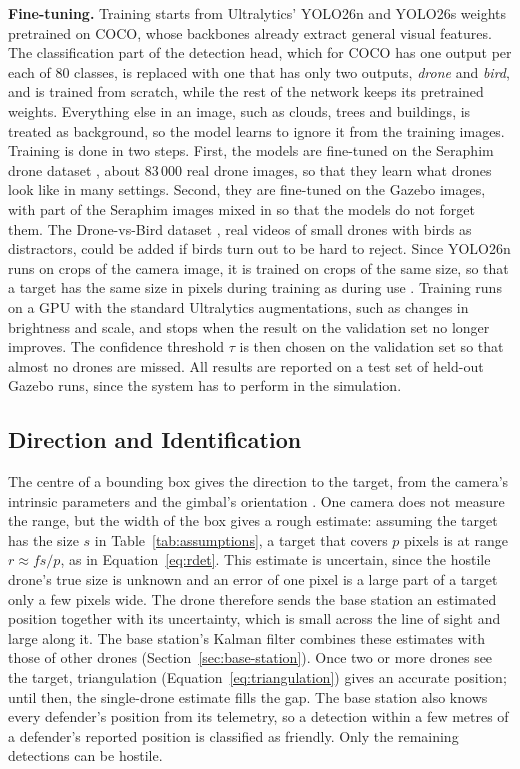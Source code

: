 \textbf{Fine-tuning.} Training starts from Ultralytics' YOLO26n and YOLO26s
weights pretrained on COCO, whose backbones already extract general visual
features. The classification part of the detection head, which for COCO has
one output per each of 80 classes, is replaced with one that has only two
outputs, \emph{drone} and \emph{bird}, and is trained from scratch, while the
rest of the network keeps its pretrained weights. Everything else in an image,
such as clouds, trees and buildings, is treated as background, so the model
learns to ignore it from the training images. Training is done in two steps.
First, the models are fine-tuned on the Seraphim drone dataset
\cite{seraphim}, about 83\,000 real drone images, so that they learn what
drones look like in many settings. Second, they are fine-tuned on the Gazebo
images, with part of the Seraphim images mixed in so that the models do not
forget them. The Drone-vs-Bird dataset \cite{coluccia2021drone}, real
videos of small drones with birds as distractors, could be added if birds
turn out to be hard to reject. Since YOLO26n runs on crops of the camera
image, it is trained on crops of the same size, so that a target has the
same size in pixels during training as during use \cite{akyon2022sahi}.
Training runs on a GPU with the standard Ultralytics augmentations, such as
changes in brightness and scale, and stops when the result on the validation
set no longer improves. The confidence threshold $\tau$ is then chosen on
the validation set so that almost no drones are missed. All results are
reported on a test set of held-out Gazebo runs, since the system has to
perform in the simulation.

\subsection{Direction and Identification}
The centre of a bounding box gives the direction to the target, from the
camera's intrinsic parameters and the gimbal's orientation
\cite{hartley2004multiple}. One camera does not measure the range, but the
width of the box gives a rough estimate: assuming the target has the size
$s$ in Table~\ref{tab:assumptions}, a target that covers $p$ pixels is at
range $r \approx f s / p$, as in Equation~\eqref{eq:rdet}. This estimate is
uncertain, since the hostile drone's true size is unknown and an error of
one pixel is a large part of a target only a few pixels wide. The drone
therefore sends the base station an estimated position together with its
uncertainty, which is small across the line of sight and large along it.
The base station's Kalman filter combines these estimates with those of
other drones (Section~\ref{sec:base-station}). Once two or more drones see
the target, triangulation (Equation~\eqref{eq:triangulation}) gives an
accurate position; until then, the single-drone estimate fills the gap.
The base station also knows every defender's position from its telemetry,
so a detection within a few metres of a defender's reported position is
classified as friendly. Only the remaining detections can be hostile.

